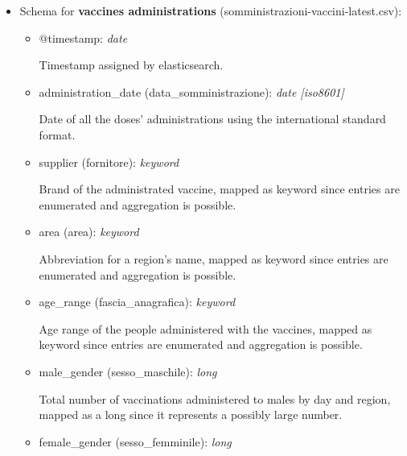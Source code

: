 \documentclass[12pt, a4paper]{article}
\begin{document}
\begin{itemize}
  \item Schema for \textbf{vaccines administrations} 
    (somministrazioni-vaccini-latest.csv):
    \begin{itemize}
      \item @timestamp: \emph{date} \\
        \begin{footnotesize}
          Timestamp assigned by elasticsearch.
        \end{footnotesize}
      \item administration\_date (data\_somministrazione): \emph{date [iso8601]} \\
        \begin{footnotesize}
          Date of all the doses' administrations using the international standard format.
        \end{footnotesize}
      \item supplier (fornitore): \emph{keyword} \\
        \begin{footnotesize}
          Brand of the administrated vaccine, mapped as keyword since entries are 
          enumerated and aggregation is possible.
        \end{footnotesize}
      \item area (area): \emph{keyword} \\
        \begin{footnotesize}
          Abbreviation for a region's name, mapped as keyword since entries are 
          enumerated and aggregation is possible.
        \end{footnotesize}
      \item age\_range (fascia\_anagrafica): \emph{keyword} \\
        \begin{footnotesize}
          Age range of the people administered with the vaccines, mapped as keyword since
          entries are enumerated and aggregation is possible.
        \end{footnotesize}
      \item male\_gender (sesso\_maschile): \emph{long} \\
        \begin{footnotesize}
          Total number of vaccinations administered to males by day and region, mapped as
          a long since it represents a possibly large number.
        \end{footnotesize}
      \item female\_gender (sesso\_femminile): \emph{long} \\

\end{itemize}
\end{itemize}
\end{document}
